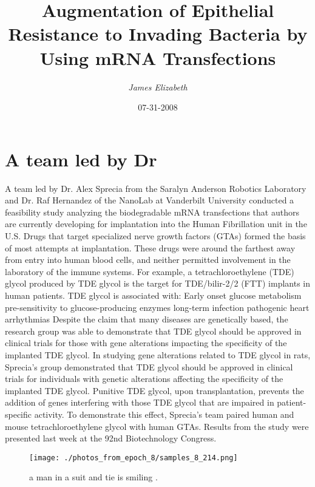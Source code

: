 \documentclass{article}%
\title{Augmentation of Epithelial Resistance to Invading Bacteria by Using mRNA Transfections}%
\author{\textit{James Elizabeth}}%
\date{07-31-2008}%
\begin{document}
%
\normalsize%
\maketitle%
\section{A team led by Dr}%
\label{sec:AteamledbyDr}%
A team led by Dr. Alex Sprecia from the Saralyn Anderson Robotics Laboratory and Dr. Raf Hernandez of the NanoLab at Vanderbilt University conducted a feasibility study analyzing the biodegradable mRNA transfections that authors are currently developing for implantation into the Human Fibrillation unit in the U.S.\newline%
Drugs that target specialized nerve growth factors (GTAs) formed the basis of most attempts at implantation. These drugs were around the farthest away from entry into human blood cells, and neither permitted involvement in the laboratory of the immune systems.\newline%
For example, a tetrachloroethylene (TDE) glycol produced by TDE glycol is the target for TDE/bilir{-}2/2 (FTT) implants in human patients. TDE glycol is associated with:\newline%
Early onset glucose metabolism\newline%
pre{-}sensitivity to glucose{-}producing enzymes\newline%
long{-}term infection\newline%
pathogenic heart arrhythmias\newline%
Despite the claim that many diseases are genetically based, the research group was able to demonstrate that TDE glycol should be approved in clinical trials for those with gene alterations impacting the specificity of the implanted TDE glycol.\newline%
In studying gene alterations related to TDE glycol in rats, Sprecia’s group demonstrated that TDE glycol should be approved in clinical trials for individuals with genetic alterations affecting the specificity of the implanted TDE glycol.\newline%
Punitive TDE glycol, upon transplantation, prevents the addition of genes interfering with those TDE glycol that are impaired in patient{-}specific activity.\newline%
To demonstrate this effect, Sprecia’s team paired human and mouse tetrachloroethylene glycol with human GTAs.\newline%
Results from the study were presented last week at the 92nd Biotechnology Congress.\newline%

%


\begin{figure}[h!]%
\centering%
\texttt{[image: ./photos\_from\_epoch\_8/samples\_8\_214.png]}%
\caption{a man in a suit and tie is smiling .}%
\end{figure}

%
\end{document}
